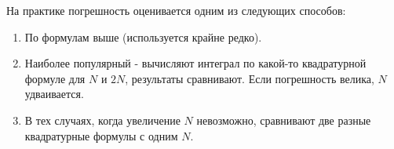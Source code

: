 \documentclass[a4paper,11pt]{article}
\begin{document}
  \begin{mainblock}
    На практике погрешность оценивается одним из следующих способов:
    \begin{enumerate}
      \item По формулам выше (используется крайне редко).
      \item Наиболее популярный - вычисляют интеграл по какой-то квадратурной формуле для $N$ и $2N$, результаты сравнивают. Если погрешность велика, $N$ удваивается.
      \item В тех случаях, когда увеличение $N$ невозможно, сравнивают две разные квадратурные формулы с одним $N$.
    \end{enumerate}
  \end{mainblock}
\end{document}

